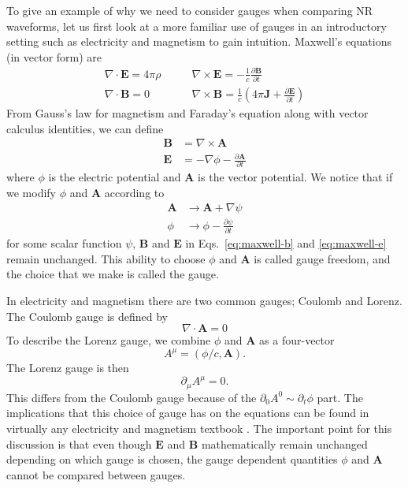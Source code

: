 \begin{bibunit}[unsrtnat]
To give an example of why we need to consider gauges when comparing NR
waveforms, let us first look at a more familiar use of gauges in an introductory
setting such as electricity and magnetism to gain intuition. Maxwell's equations
(in vector form) are
\begin{align}
  \nabla \cdot \mathbf{E} = 4\pi\rho &\quad\quad
  \nabla \times \mathbf{E} = -\frac{1}{c}\frac{\partial \mathbf{B}}{\partial t} \\
  \nabla \cdot \mathbf{B} = 0 &\quad\quad
  \nabla \times \mathbf{B} = \frac{1}{c}\left(4\pi\mathbf{J} + \frac{\partial \mathbf{E}}{\partial t}\right)
\end{align}
From Gauss's law for magnetism and Faraday's equation along with vector calculus
identities, we can define
\begin{align}
  \mathbf{B} &= \nabla \times \mathbf{A}\label{eq:maxwell-b} \\
  \mathbf{E} &= -\nabla\phi - \frac{\partial \mathbf{A}}{\partial t}\label{eq:maxwell-e}
\end{align}
where $\phi$ is the electric potential and $\mathbf{A}$ is the vector potential.
We notice that if we modify $\phi$ and $\mathbf{A}$ according to
\begin{align}
  \mathbf{A} &\rightarrow \mathbf{A} + \nabla\psi\label{eq:maxwell-a} \\
  \phi &\rightarrow \phi - \frac{\partial \psi}{\partial t}\label{eq:maxwell-phi}
\end{align}
for some scalar function $\psi$, $\mathbf{B}$ and $\mathbf{E}$ in
Eqs.~\ref{eq:maxwell-b} and \ref{eq:maxwell-e} remain unchanged. This ability to
choose $\phi$ and $\mathbf{A}$ is called gauge freedom, and the choice that we
make is called the gauge.

In electricity and magnetism there are two common gauges; Coulomb and Lorenz.
The Coulomb gauge is defined by
\begin{equation}
  \nabla \cdot \mathbf{A} = 0
\end{equation}
To describe the Lorenz gauge, we combine $\phi$ and $\mathbf{A}$ as a
four-vector
\begin{equation}
  A^\mu = \left(\phi/c,\mathbf{A}\right) .
\end{equation}
The Lorenz gauge is then
\begin{equation}
  \partial_\mu A^\mu = 0.
\end{equation}
This differs from the Coulomb gauge because of the $\partial_0 A^0 \sim
\partial_t \phi$ part. The implications that this choice of gauge has on the
equations can be found in virtually any electricity and magnetism textbook
\cite{Jackson:1998nia,Griffiths:2017ngp}. The important point for this discussion is that even though
$\mathbf{E}$ and $\mathbf{B}$ mathematically remain unchanged depending on which
gauge is chosen, the gauge dependent quantities $\phi$ and $\mathbf{A}$ cannot
be compared between gauges.


\end{bibunit}
